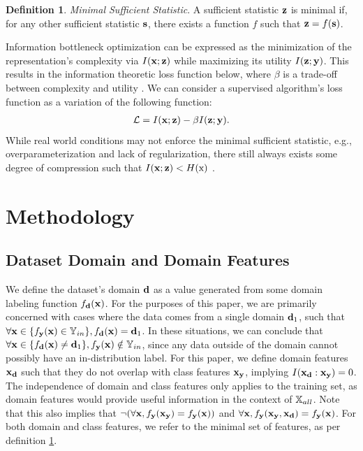 \documentclass[letterpaper]{article} %
\theoremstyle{plain}
\theoremstyle{definition}
\newtheorem{definition}[theorem]{Definition}
\theoremstyle{remark}
\begin{document}
\begin{definition}
\emph{Minimal Sufficient Statistic}. A sufficient statistic ${\mathbf{z}}$ is minimal if, for any other sufficient statistic ${\mathbf{s}}$, there exists a function $f$ such that ${\mathbf{z}} = f({\mathbf{s}})$.
\label{defineminsuff}
\end{definition}
Information bottleneck optimization can be expressed as the minimization of the representation's complexity via $I({\mathbf{x}};{\mathbf{z}})$ while maximizing its utility $I({\mathbf{z}};{\mathbf{y}})$. This results in the information theoretic loss function below, where $\beta$ is a trade-off between complexity and utility \citep{shwartz2023compress}. We can consider a supervised algorithm's loss function as a variation of the following function:
\begin{align}
\mathcal{L}=I({\mathbf{x}} ; {\mathbf{z}})-\beta I({\mathbf{z}} ;{\mathbf{y}}).
\end{align}
While real world conditions may not enforce the minimal sufficient statistic, e.g., overparameterization and lack of regularization, there still always exists some degree of compression such that $I({\mathbf{x}} ; {\mathbf{z}})<H({\textnormal{x}})$ \citep{shwartz2017opening}. 

\section{Methodology}
\label{sec:method}

\subsection{Dataset Domain and Domain Features}

We define the dataset's domain ${\mathbf{d}}$ as a value generated from some domain labeling function $f_{{\mathbf{d}}}({\mathbf{x}})$. For the purposes of this paper, we are primarily concerned with cases where the data comes from a single domain ${\mathbf{d}}_1$, such that $\forall {\mathbf{x}} \in  \{f_{{\mathbf{y}}}({\mathbf{x}}) \in  {\mathbb{Y}}_{in}\}, f_{{\mathbf{d}}}({\mathbf{x}}) = {\mathbf{d}}_1$. In these situations, we can conclude that $\forall {\mathbf{x}} \in \{f_{{\mathbf{d}}}({\mathbf{x}}) \neq {\mathbf{d}}_1\}, f_{{\mathbf{y}}}({\mathbf{x}}) \notin {\mathbb{Y}}_{in}$, since any data outside of the domain cannot possibly have an in-distribution label. 
For this paper, we define domain features ${\mathbf{x}}_{\mathbf{d}}$ such that they do not overlap with class features ${\mathbf{x}}_{\mathbf{y}}$, implying $I({\mathbf{x}}_{\mathbf{d}}:{\mathbf{x}}_{\mathbf{y}}) = 0$. The independence of domain and class features only applies to the training set, as domain features would provide useful information in the context of ${\mathbb{X}}_{all}$. Note that this also implies that $\neg(\forall{\mathbf{x}},  f_{\mathbf{y}}({\mathbf{x}}_{\mathbf{y}}) = f_{\mathbf{y}}({\mathbf{x}}))$ and $\forall{\mathbf{x}}, f_{\mathbf{y}}({\mathbf{x}}_{\mathbf{y}}, {\mathbf{x}}_{\mathbf{d}}) = f_{\mathbf{y}}({\mathbf{x}})$. For both domain and class features, we refer to the minimal set of features, as per definition \ref{defineminsuff}. 
\end{document}
